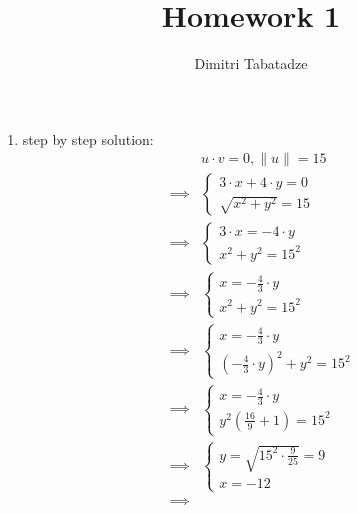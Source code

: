 \documentclass{article}
\author{Dimitri Tabatadze}
\title{Homework 1}
\begin{document}
    \maketitle

    \begin{enumerate}
        \item { step by step solution:
            \begin{displaymath}
                \begin{aligned}
                    & u \cdot v = 0, \|u\| = 15 \\ \implies &
                    \begin{cases}
                        3 \cdot x + 4 \cdot y = 0 \\
                        \sqrt{x^2 + y^2} = 15
                    \end{cases} \\ \implies &
                    \begin{cases}
                        3 \cdot x = -4 \cdot y \\
                        x^2 + y^2 = 15^2
                    \end{cases} \\ \implies &
                    \begin{cases}
                        x = -\frac{4}{3} \cdot y \\
                        x^2 + y^2 = 15^2
                    \end{cases} \\ \implies &
                    \begin{cases}
                        x = -\frac{4}{3} \cdot y \\
                        \left(-\frac{4}{3} \cdot y\right)^2 + y^2 = 15^2
                    \end{cases} \\ \implies &
                    \begin{cases}
                        x = -\frac{4}{3} \cdot y \\
                        y^2\left(\frac{16}{9} + 1\right) = 15^2
                    \end{cases} \\ \implies &
                    \begin{cases}
                        y = \sqrt{15^2\cdot\frac{9}{25}} = 9 \\
                        x = -12
                    \end{cases} \\ \implies &

\end{aligned}
\end{displaymath}}
\end{enumerate}
\end{document}
